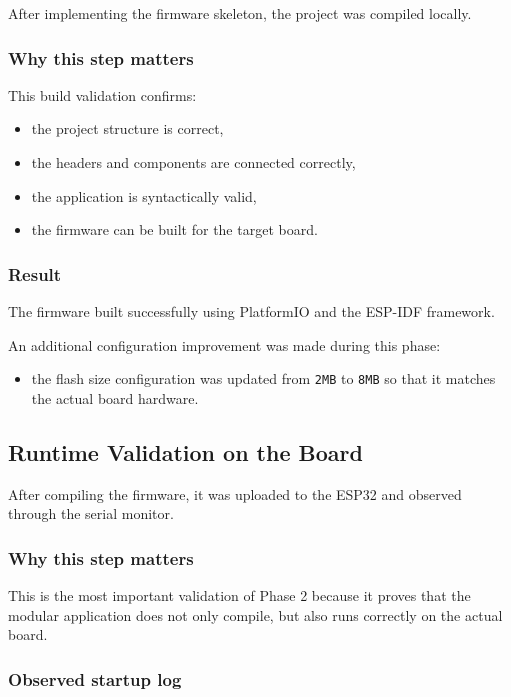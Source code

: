 \documentclass[12pt,a4paper]{article}
\begin{document}
After implementing the firmware skeleton, the project was compiled locally.

\subsubsection*{Why this step matters}

This build validation confirms:

\begin{itemize}
    \item the project structure is correct,
    \item the headers and components are connected correctly,
    \item the application is syntactically valid,
    \item the firmware can be built for the target board.
\end{itemize}

\subsubsection*{Result}

The firmware built successfully using PlatformIO and the ESP-IDF framework.

An additional configuration improvement was made during this phase:

\begin{itemize}
    \item the flash size configuration was updated from \texttt{2MB} to
    \texttt{8MB} so that it matches the actual board hardware.
\end{itemize}

\subsection{Runtime Validation on the Board}

After compiling the firmware, it was uploaded to the ESP32 and observed through
the serial monitor.

\subsubsection*{Why this step matters}

This is the most important validation of Phase 2 because it proves that the
modular application does not only compile, but also runs correctly on the
actual board.

\subsubsection*{Observed startup log}
\end{document}
